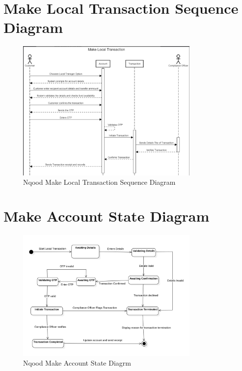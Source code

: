 \documentclass[a4paper]{report}
\begin{document}
\section{Make Local Transaction Sequence Diagram}

\begin{figure}[h!]
    \centering
    \includegraphics[width=0.8\textwidth]{images/nqood-make-local-tx-sequence-diagram.png}
    \caption{Nqood Make Local Transaction Sequence Diagram}
    \label{fig:nqood-make-local-transaction-sequence-diagram}
\end{figure}

\section{Make Account State Diagram}

\begin{figure}[h!]
    \centering
    \includegraphics[width=0.8\textwidth]{images/nqood-account-tx-state-diagram.png}
    \caption{Nqood Make Account State Diagrm}
    \label{fig:nqood-make-account-state-diagram}
\end{figure}
\end{document}
